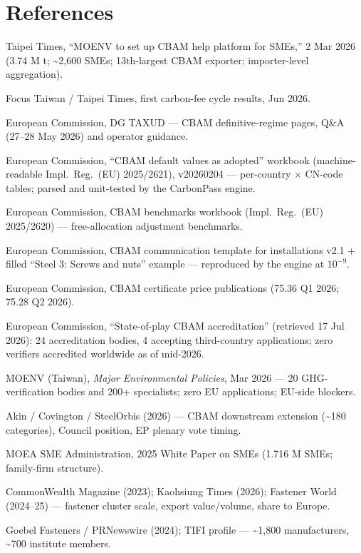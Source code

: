 \documentclass[11pt]{article}
\newcommand{\euro}{\texteuro}
\begin{document}
\section*{References}
\small
\begin{enumerate}[leftmargin=2.2em,itemsep=1.5pt,label={[\arabic*]}]
\item Taipei Times, ``MOENV to set up CBAM help platform for SMEs,'' 2 Mar 2026 (3.74 M t; \textasciitilde2{,}600 SMEs; 13th-largest CBAM exporter; importer-level aggregation).
\item Focus Taiwan / Taipei Times, first carbon-fee cycle results, Jun 2026.
\item European Commission, DG TAXUD --- CBAM definitive-regime pages, Q\&A (27--28 May 2026) and operator guidance.
\item European Commission, ``CBAM default values as adopted'' workbook (machine-readable Impl.\ Reg.\ (EU) 2025/2621), v20260204 --- per-country $\times$ CN-code tables; parsed and unit-tested by the CarbonPass engine.
\item European Commission, CBAM benchmarks workbook (Impl.\ Reg.\ (EU) 2025/2620) --- free-allocation adjustment benchmarks.
\item European Commission, CBAM communication template for installations v2.1 + filled ``Steel 3: Screws and nuts'' example --- reproduced by the engine at $10^{-9}$.
\item European Commission, CBAM certificate price publications (\euro{}75.36 Q1 2026; \euro{}75.28 Q2 2026).
\item European Commission, ``State-of-play CBAM accreditation'' (retrieved 17 Jul 2026): 24 accreditation bodies, 4 accepting third-country applications; zero verifiers accredited worldwide as of mid-2026.
\item MOENV (Taiwan), \emph{Major Environmental Policies}, Mar 2026 --- 20 GHG-verification bodies and 200+ specialists; zero EU applications; EU-side blockers.
\item Akin / Covington / SteelOrbis (2026) --- CBAM downstream extension (\textasciitilde180 categories), Council position, EP plenary vote timing.
\item MOEA SME Administration, 2025 White Paper on SMEs (1.716 M SMEs; family-firm structure).
\item CommonWealth Magazine (2023); Kaohsiung Times (2026); Fastener World (2024--25) --- fastener cluster scale, export value/volume, share to Europe.
\item Goebel Fasteners / PRNewswire (2024); TIFI profile --- \textasciitilde1{,}800 manufacturers, \textasciitilde700 institute members.

\end{enumerate}
\end{document}
